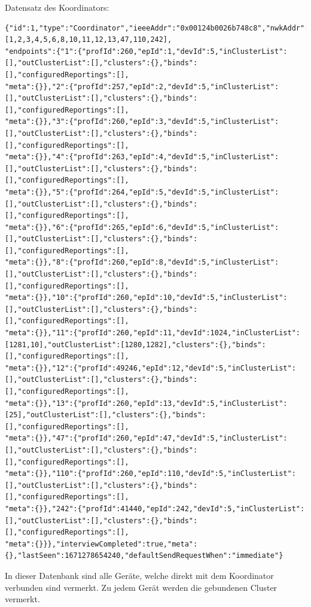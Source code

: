   Datensatz des Koordinators:
  \begin{lstlisting}
{"id":1,"type":"Coordinator","ieeeAddr":"0x00124b0026b748c8","nwkAddr":0,"manufId":0,"epList":[1,2,3,4,5,6,8,10,11,12,13,47,110,242],
"endpoints":{"1":{"profId":260,"epId":1,"devId":5,"inClusterList":[],"outClusterList":[],"clusters":{},"binds":[],"configuredReportings":[],
"meta":{}},"2":{"profId":257,"epId":2,"devId":5,"inClusterList":[],"outClusterList":[],"clusters":{},"binds":[],"configuredReportings":[],
"meta":{}},"3":{"profId":260,"epId":3,"devId":5,"inClusterList":[],"outClusterList":[],"clusters":{},"binds":[],"configuredReportings":[],
"meta":{}},"4":{"profId":263,"epId":4,"devId":5,"inClusterList":[],"outClusterList":[],"clusters":{},"binds":[],"configuredReportings":[],
"meta":{}},"5":{"profId":264,"epId":5,"devId":5,"inClusterList":[],"outClusterList":[],"clusters":{},"binds":[],"configuredReportings":[],
"meta":{}},"6":{"profId":265,"epId":6,"devId":5,"inClusterList":[],"outClusterList":[],"clusters":{},"binds":[],"configuredReportings":[],
"meta":{}},"8":{"profId":260,"epId":8,"devId":5,"inClusterList":[],"outClusterList":[],"clusters":{},"binds":[],"configuredReportings":[],
"meta":{}},"10":{"profId":260,"epId":10,"devId":5,"inClusterList":[],"outClusterList":[],"clusters":{},"binds":[],"configuredReportings":[],
"meta":{}},"11":{"profId":260,"epId":11,"devId":1024,"inClusterList":[1281,10],"outClusterList":[1280,1282],"clusters":{},"binds":[],"configuredReportings":[],
"meta":{}},"12":{"profId":49246,"epId":12,"devId":5,"inClusterList":[],"outClusterList":[],"clusters":{},"binds":[],"configuredReportings":[],
"meta":{}},"13":{"profId":260,"epId":13,"devId":5,"inClusterList":[25],"outClusterList":[],"clusters":{},"binds":[],"configuredReportings":[],
"meta":{}},"47":{"profId":260,"epId":47,"devId":5,"inClusterList":[],"outClusterList":[],"clusters":{},"binds":[],"configuredReportings":[],
"meta":{}},"110":{"profId":260,"epId":110,"devId":5,"inClusterList":[],"outClusterList":[],"clusters":{},"binds":[],"configuredReportings":[],
"meta":{}},"242":{"profId":41440,"epId":242,"devId":5,"inClusterList":[],"outClusterList":[],"clusters":{},"binds":[],"configuredReportings":[],
"meta":{}}},"interviewCompleted":true,"meta":{},"lastSeen":1671278654240,"defaultSendRequestWhen":"immediate"}

  \end{lstlisting}

In dieser Datenbank sind alle Geräte, welche direkt mit dem Koordinator verbunden sind vermerkt. Zu jedem Gerät werden die gebundenen Cluster vermerkt.

